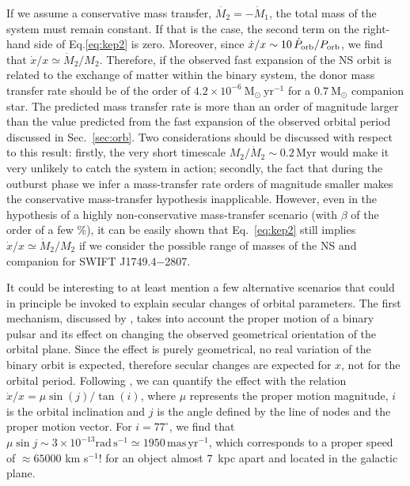 \documentclass[fleqn,usenatbib]{mnras}
\newcommand{\swiftj}{SWIFT J1749.4$-$2807}
\begin{document}
If we assume a conservative mass transfer, $\dot{M_2}=-\dot{M}_1$, the total mass of the system must remain constant. If that is the case, the second term on the right-hand side of Eq.\ref{eq:kep2} is zero. Moreover, since $\dot{x}/{x} \sim 10\,\dot{P}_{\rm orb}/P_{\rm orb}$, we find that $\dot{x}/{x}\simeq \dot{M}_2/{M_2}$. Therefore, if the observed fast expansion of the NS orbit is related to the exchange of matter within the binary system, the donor mass transfer rate should be of the order of $4.2\times 10^{-6}~\text{M}_{\odot}~\text{yr}^{-1}$ for a $0.7~\text{M}_{\odot}$ companion star. The predicted mass transfer rate is more than an order of magnitude larger than the value predicted from the fast expansion of the observed orbital period discussed in Sec.~\ref{sec:orb}. Two considerations should be discussed with respect to this result: firstly, the very short timescale $M_2/\dot{M}_2\sim0.2\,\text{Myr}$ would make it very unlikely to catch the system in action; secondly, the fact that during the outburst phase we infer a mass-transfer rate orders of magnitude smaller makes the conservative mass-transfer hypothesis inapplicable. However, even in the hypothesis of a highly non-conservative mass-transfer scenario (with $\beta$ of the order of a few \%), it can be easily shown that Eq.~\ref{eq:kep2} still implies $\dot{x}/{x}\simeq \dot{M}_2/{M_2}$ if we consider the possible range of masses of the NS and companion for \swiftj{}. 

It could be interesting to at least mention a few alternative scenarios that could in principle be invoked to explain secular changes of orbital parameters. The first mechanism, discussed by \citet{Kopeikin:1996wy}, takes into account the proper motion of a binary pulsar and its effect on changing the observed geometrical orientation of the orbital plane. Since the effect is purely geometrical, no real variation of the binary orbit is expected, therefore secular changes are expected for $x$, not for the orbital period. Following \citet{Arzoumanian:1996up}, we can quantify the effect with the relation $\dot{x}/x=\mu \sin{(j)}/\tan{(i)}$, where $\mu$ represents the proper motion magnitude, $i$ is the orbital inclination and $j$ is the angle defined by the line of nodes and the proper motion vector. For $i=77^{\circ}$, we find that $\mu \sin j\sim 3\times 10^{-13} \text{rad}\, \text{s}^{-1}\simeq 1950\,\text{mas}\, \text{yr}^{-1}$, which corresponds to a proper speed of $\approx 65000$ km s$^{-1}$! for an object almost $7$~kpc apart and located in the galactic plane. 
\end{document}
